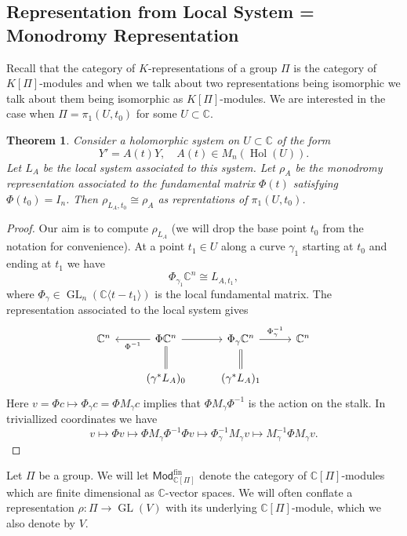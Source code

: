 \documentclass[12pt]{book}
\numberwithin{equation}{section}
\newtheorem{theorem}{Theorem}[subsection]
\theoremstyle{definition}
\theoremstyle{remark}
\newcommand{\CC}{\mathbb{C}}
\newcommand{\hol}{\operatorname{Hol}}
\newcommand{\GL}{\operatorname{GL}}
\newcommand{\Mod}{\mathsf{Mod}}
\newcommand{\fin}{\operatorname{fin}}
\begin{document}
\subsection{Representation from Local System = Monodromy Representation}
Recall that the category of $K$-representations of a group $\Pi$ is the category of $K[\Pi]$-modules and when we talk about two representations being isomorphic we talk about them being isomorphic as $K[\Pi]$-modules. 
We are interested in the case when $\Pi = \pi_1(U,t_0)$ for some $U\subset \CC$. 

\begin{theorem}
	Consider a holomorphic system on $U\subset \CC$ of the form 
	$$ Y' = A(t) Y, \quad A(t) \in M_n(\hol(U)). $$
	Let $L_A$ be the local system associated to this system. 
	Let $\rho_A$ be the monodromy representation associated to the fundamental matrix $\Phi(t)$ satisfying $\Phi(t_0)=I_n$. 
	Then $\rho_{L_A,t_0} \cong \rho_A$ as reprentations of $\pi_1(U,t_0)$.
\end{theorem}
\begin{proof}
	Our aim is to compute $\rho_{L_A}$ (we will drop the base point $t_0$ from the notation for convenience). 
	At a point $t_1\in U$ along a curve $\gamma_1$ starting at $t_0$ and ending at $t_1$ we have 
	$$ \Phi_{\gamma_1} \CC^n \cong L_{A,t_1},$$
	where $\Phi_{\gamma} \in \GL_n(\CC\langle t-t_1\rangle)$ is the local fundamental matrix. 
	The representation associated to the local system gives 
	$$\begin{tikzcd}
	\CC^n & \arrow[l, "\Phi ^{-1}"] \Phi \CC^n \arrow[r] & \Phi_{\gamma} \CC^n \arrow[r, "\Phi_{\gamma}^{-1}"] & \CC^n  \\
	& (\gamma^*L_A)_0 \ar[u, equal] & (\gamma^*L_A)_1 \ar[u, equal]& 
	\end{tikzcd}
	$$
	Here $v= \Phi c \mapsto \Phi_{\gamma} c = \Phi M_{\gamma} c$ implies that $\Phi M_{\gamma} \Phi^{-1}$ is the action on the stalk. 
	In triviallized coordinates we have 
	$$ v \mapsto \Phi v \mapsto \Phi M_{\gamma} \Phi^{-1} \Phi v \mapsto \Phi_{\gamma}^{-1} M_{\gamma} v \mapsto M_{\gamma}^{-1} \Phi M_{\gamma} v.$$
\end{proof}

Let $\Pi$ be a group. 
We will let $\Mod^{\fin}_{\CC[\Pi]}$ denote the category of $\CC[\Pi]$-modules which are finite dimensional as $\CC$-vector spaces. 
We will often conflate a representation $\rho: \Pi \to \GL(V)$ with its underlying  $\CC[\Pi]$-module, which we also denote by $V$.  
\end{document}
